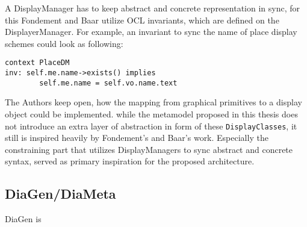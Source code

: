 A DisplayManager has to keep abstract and concrete representation in sync, for this Fondement and Baar utilize OCL invariants, which are defined on the DisplayerManager. For example, an invariant to sync the name of place display schemes could look as following:

\begin{lstlisting}[language=OCL,captionpos=b,caption={OCL Invariant that syncs the name attribute of \texttt{DisplayClass} and model element.}]
context PlaceDM
inv: self.me.name->exists() implies
        self.me.name = self.vo.name.text
\end{lstlisting}

The Authors keep open, how the mapping from graphical primitives to a display object could be implemented. while the metamodel proposed in this thesis does not introduce an extra layer of abstraction in form of these \texttt{DisplayClasses}, it still is inspired heavily by Fondement's and Baar's work. Especially the constraining part that utilizes DisplayManagers to sync abstract and concrete syntax, served as primary inspiration for the proposed architecture.


\subsection{DiaGen/DiaMeta}
DiaGen is 


